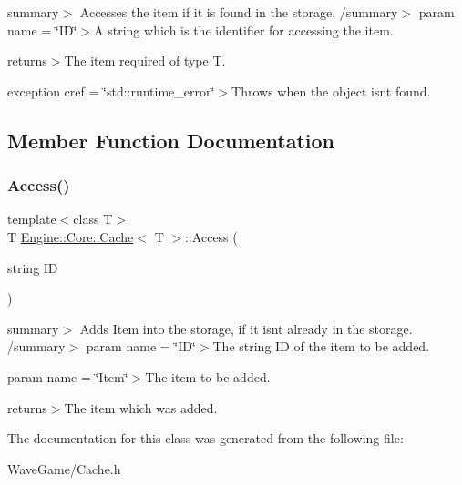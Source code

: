 summary$>$ Accesses the item if it is found in the storage. /summary$>$ param name = \char`\"{}\+I\+D\char`\"{}$>$A string which is the identifier for accessing the item.

returns$>$The item required of type T.

exception cref = \char`\"{}std\+::runtime\+\_\+error\char`\"{}$>$Throws when the object isn\textquotesingle{}t found.

\subsection{Member Function Documentation}
\mbox{\label{class_engine_1_1_core_1_1_cache_a1a4d83ac2cc8656acb5c99e4999e1551}} 
\subsubsection{\texorpdfstring{Access()}{Access()}}
{\footnotesize\ttfamily template$<$class T$>$ \\
T \hyperlink{class_engine_1_1_core_1_1_cache}{Engine\+::\+Core\+::\+Cache}$<$ T $>$\+::Access (\begin{DoxyParamCaption}\item[{string}]{ID }\end{DoxyParamCaption})\hspace{0.3cm}{\ttfamily [inline]}}

summary$>$ Adds Item into the storage, if it isn\textquotesingle{}t already in the storage. /summary$>$ param name = \char`\"{}\+I\+D\char`\"{}$>$The string ID of the item to be added.

param name = \char`\"{}\+Item\char`\"{}$>$The item to be added.

returns$>$The item which was added.

The documentation for this class was generated from the following file\+:\begin{DoxyCompactItemize}
\item 
Wave\+Game/Cache.\+h\end{DoxyCompactItemize}
